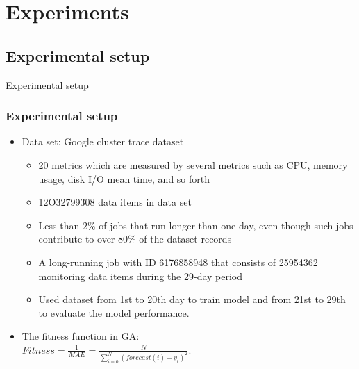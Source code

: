 \documentclass{beamer}
\begin{document}
\section{Experiments}
\subsection{Experimental setup}
\begin{frame}{Experimental setup}
	\frametitle{Experimental setup}
	\begin{itemize}
		\item {
			Data set: Google cluster trace dataset
		}
		\begin{itemize}
			\item 20 metrics which are measured by several metrics such as CPU, memory usage, disk I/O mean time, and so forth
			\item 12O32799308 data items in data set
			\item  Less than 2\% of jobs that run longer than one day, even though such jobs contribute to over 80\% of the dataset records
			\item A long-running job with ID 6176858948 that consists of 25954362 monitoring data items during the 29-day period
			\item Used dataset from 1st to 20th day to train model and from 21st to 29th to evaluate the model performance.
		\end{itemize}
		\item{
			The fitness function in GA: \\
			$Fitness = \displaystyle \frac{1}{MAE} = \frac{N}{ \displaystyle \sum_{i=0}^N( forecast(i) - y_i)^2 }	\label{eq_fitness} $. 
			}
	\end{itemize}
\end{frame}
\end{document}
